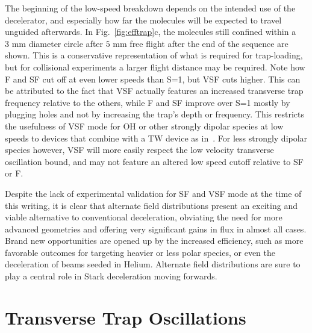 The beginning of the low-speed breakdown depends on the intended use of the decelerator, and especially how far the molecules will be expected to travel unguided afterwards. 
In Fig.~\ref{fig:efftrap}c, the molecules still confined within a $3\text{ mm}$ diameter circle after $5\text{ mm}$ free flight after the end of the sequence are shown. 
This is a conservative representation of what is required for trap-loading, but for collisional experiments a larger flight distance may be required.
Note how F and SF cut off at even lower speeds than S=1, but VSF cuts higher. 
This can be attributed to the fact that VSF actually features an increased transverse trap frequency relative to the others, while F and SF improve over S=1 mostly by plugging holes and not by increasing the trap's depth or frequency.
This restricts the usefulness of VSF mode for OH or other strongly dipolar species at low speeds to devices that combine with a TW device as in~\cite{Quintero-Perez2013}.
For less strongly dipolar species however, VSF will more easily respect the low velocity transverse oscillation bound, and may not feature an altered low speed cutoff relative to SF or F.

Despite the lack of experimental validation for SF and VSF mode at the time of this writing, it is clear that alternate field distributions present an exciting and viable alternative to conventional deceleration, obviating the need for more advanced geometries and offering very significant gains in flux in almost all cases.
Brand new opportunities are opened up by the increased efficiency, such as more favorable outcomes for targeting heavier or less polar species, or even the deceleration of beams seeded in Helium.
Alternate field distributions are sure to play a central role in Stark deceleration moving forwards.

\section{Transverse Trap Oscillations}\label{ttosec}

